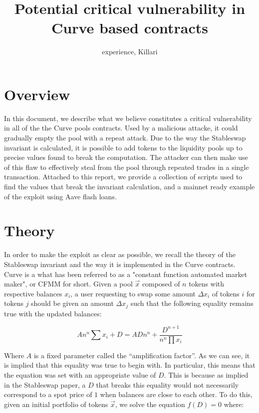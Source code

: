 \documentclass{article}
\title{Potential critical vulnerability in Curve based contracts}
\author{experience, Killari}
\begin{document}
    \maketitle

    \section{Overview}

    In this document, we describe what we believe constitutes a critical vulnerability in all of the the Curve pools contracts. Used by a malicious attacke, it could gradually empty the pool with a repeat attack.  Due to the way the Stableswap invariant is calculated, it is possible to add tokens to the liquidity pools up to precise values found to break the computation. The attacker can then make use of this flaw to effectively steal from the pool  through repeated trades in a single transaction. Attached to this report, we provide a collection of scripts used to find the values that break the invariant calculation, and a mainnet ready example of the exploit using Aave flash loans. 

    \section{Theory}

    In order to make the exploit as clear as possible, we recall the theory of the Stableswap invariant and the way it is implemented in the Curve contracts. Curve is a what has been referred to as a "constant function automated market maker", or CFMM for short. Given a pool $\vec{x}$ composed of $n$ tokens with respective balances $x_{i}$, a user requesting to swap some amount $\Delta x_{i}$ of tokens $i$ for tokens $j$ should be given an amount $\Delta x_{j}$ such that the following equality remains true with the updated balances: 

    \begin{equation}
        A n^{n} \sum x_{i}+D=A D n^{n}+\frac{D^{n+1}}{n^{n} \prod x_{i}}
    \end{equation}

    Where $A$ is a fixed parameter called the ``amplification factor''. As we can see, it is implied that this equality was true to begin with. In particular, this means that the equation was set with an appropriate value of $D$. This is because as implied in the Stableswap paper, a $D$ that breaks this equality would not necessarily correspond to a spot price of $1$ when balances are close to each other. To do this, given an initial portfolio of tokens $\vec{x}$, we solve the equation $f(D) = 0$ where: 
\end{document}
